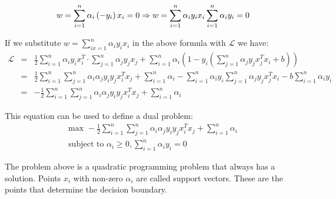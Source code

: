 \begin{equation}
w = \sum_{i=1}^{n}\alpha_i\left(-y_i\right)x_i=0 \Rightarrow w = \sum_{i=1}^{n}\alpha_i y_i x_i \\
\sum_{i=1}^{n}\alpha_i y_i=0
\end{equation}

If we substitute $w=\sum_{ix=1}^{n}\alpha_i y_i x_i$ in the above formula with $\mathcal{L}$ we have:
\begin{eqnarray*}
\mathcal{L} & = &\frac{1}{2}\sum_{i=1}^{n}\alpha_iy_ix_i^T \cdot \sum_{j=1}^{n}\alpha_jy_jx_j+\sum_{i=1}^{n}\alpha_i\left(1-y_i\left(\sum_{j=1}^{n}\alpha_jy_jx_j^Tx_i+b\right)\right) \\
& = &\frac{1}{2}\sum_{i=1}^{n}\sum_{j=1}^{n}\alpha_i\alpha_j y_i y_j x_i^T x_j + \sum_{i=1}^{n}\alpha_i-\sum_{i=1}^{n}\alpha_i y_i \sum_{j=1}^{n}\alpha_j y_j x_j^T x_i -b\sum_{i=1}^{n}\alpha_i y_i \\
& = &-\frac{1}{2}\sum_{i=1}^{n}\sum_{j=1}^{n}\alpha_i\alpha_j y_i y_j x_i^T x_j + \sum_{i=1}^{n}\alpha_i
\end{eqnarray*}

This equation can be used to define a dual problem:
\begin{eqnarray*}\label{eq:svm_dual}
\textrm{max }-\frac{1}{2}\sum_{i=1}^{n}\sum_{j=1}^{n}\alpha_i\alpha_j y_i y_j x_i^T x_j + \sum_{i=1}^{n}\alpha_i \\
\textrm{subject to }\alpha_i \ge 0, \sum_{i=1}^{n} \alpha_iy_i =0
\end{eqnarray*}

The problem above is a quadratic programming problem that always has a solution. Points $x_i$ with non-zero $\alpha_i$ are called support vectors. These are the points that determine the decision boundary.


